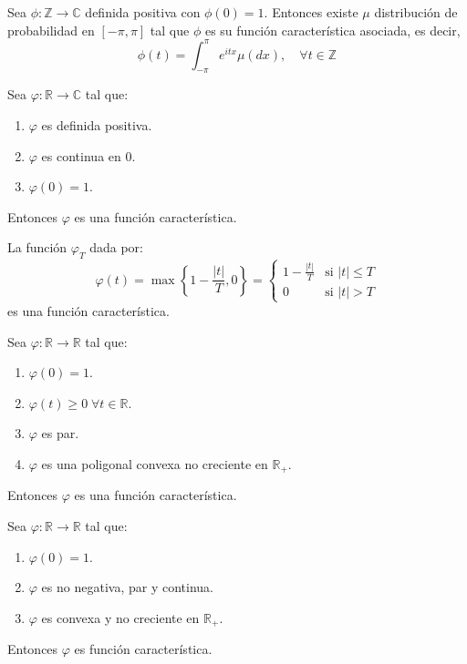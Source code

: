 \begin{lemma}[Herglotz]
    Sea $\phi: \mathbb{Z} \to \mathbb{C}$ definida positiva con $\phi(0) = 1$.
    Entonces existe $\mu$ distribución de probabilidad en $[-\pi, \pi]$ tal que $\phi$ es su función característica asociada, es decir,
    $$\phi(t) = \int_{-\pi}^\pi e^{itx}\mu(dx), \quad \forall t \in \mathbb{Z}$$
\end{lemma}

\begin{theorem}[Bochner]
    Sea $\varphi: \mathbb{R} \to \mathbb{C}$ tal que:
    \begin{enumerate}
        \item $\varphi$ es definida positiva.
        \item $\varphi$ es continua en 0.
        \item $\varphi(0) = 1$.
    \end{enumerate}
    Entonces $\varphi$ es una función característica.
\end{theorem}

\begin{proposition}
    La función $\varphi_T$ dada por:
    $$\varphi(t) = \max\left\{1-\frac{|t|}{T}, 0\right\} = \begin{cases}
            1 - \frac{|t|}{T} & \text{si } |t| \leq T \\
            0                 & \text{si } |t| > T
        \end{cases}$$
    es una función característica.
\end{proposition}

\begin{lemma}
    Sea $\varphi: \mathbb{R} \to \mathbb{R}$ tal que:
    \begin{enumerate}
        \item $\varphi(0) = 1$.
        \item $\varphi(t) \geq 0 \; \forall t \in \mathbb{R}$.
        \item $\varphi$ es par.
        \item $\varphi$ es una poligonal convexa no creciente en $\mathbb{R}_+$.
    \end{enumerate}
    Entonces $\varphi$ es una función característica.
\end{lemma}

\begin{theorem}
    Sea $\varphi: \mathbb{R} \to \mathbb{R}$ tal que:
    \begin{enumerate}
        \item $\varphi(0) = 1$.
        \item $\varphi$ es no negativa, par y continua.
        \item $\varphi$ es convexa y no creciente en $\mathbb{R}_+$.
    \end{enumerate}
    Entonces $\varphi$ es función característica.
\end{theorem}

